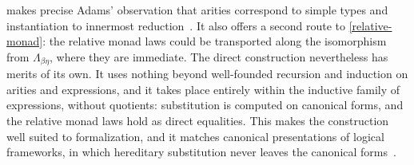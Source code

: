 
\begin{remark}
     makes precise Adams' observation that arities correspond to simple types and instantiation to innermost reduction~\cite[\S2.3]{Adams2008}. It also offers a second route to \cref{relative-monad}: the relative monad laws could be transported along the isomorphism from $\Lambda_{\beta\eta}$, where they are immediate. The direct construction nevertheless has merits of its own. It uses nothing beyond well-founded recursion and induction on arities and expressions, and it takes place entirely within the inductive family of expressions, without quotients: substitution is computed on canonical forms, and the relative monad laws hold as direct equalities. This makes the construction well suited to formalization, and it matches canonical presentations of logical frameworks, in which hereditary substitution never leaves the canonical forms~\cite{HarperLicata2007}.
\end{remark}

